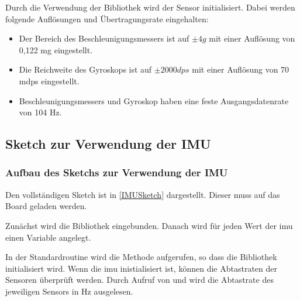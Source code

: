 
\bigskip

Durch die Verwendung der Bibliothek wird der Sensor initialisiert.  Dabei werden folgende Auflösungen und Übertragungsrate eingehalten:


\begin{itemize}
  \item Der Bereich des Beschleunigungsmessers ist auf $\pm 4 g$ mit einer Auflösung von 0,122 mg eingestellt.
  \item Die Reichweite des Gyroskops ist auf $\pm 2000 dps$ mit einer Auflösung von 70 mdps eingestellt.
  \item Beschleunigungsmessers und Gyroskop haben eine feste Ausgangsdatenrate von 104 Hz.
\end{itemize}


%

\subsection{Sketch zur Verwendung der IMU}

\subsubsection{Aufbau des Sketchs zur Verwendung der IMU}

Den vollständigen Sketch ist in \ref{IMUSketch} dargestellt. Dieser muss auf das Board geladen werden.

Zunächst wird die Bibliothek eingebunden. Danach wird für jeden Wert der \ac{imu} einen Variable angelegt. 

In der Standardroutine  wird die Methode  aufgerufen, so dass die Bibliothek initialisiert wird. Wenn die \ac{imu} inistialisiert ist, können die Abtastraten der Sensoren überprüft werden. Durch Aufruf von  und  wird die Abtastrate des jeweiligen Sensors in Hz ausgelesen.


